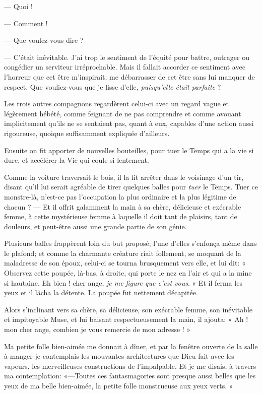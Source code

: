 --- Quoi !

--- Comment !

--- Que voulez{}-vous dire ?

--- C’était inévitable. J’ai trop le
sentiment de l’équité pour battre, outrager ou
congédier un serviteur irréprochable. Mais il fallait accorder ce
sentiment avec l’horreur que cet être
m’inspirait; me débarrasser de cet être sans lui
manquer de respect. Que vouliez{}-vous que je fisse
d’elle, \textit{puisqu’elle était parfaite} ?

Les trois autres compagnons regardèrent celui{}-ci avec un regard vague
et légèrement hébété, comme feignant de ne pas comprendre et comme
avouant implicitement qu’ils ne se sentaient pas,
quant à eux, capables d’une action aussi rigoureuse,
quoique suffisamment expliquée d’ailleurs.

Ensuite on fit apporter de nouvelles bouteilles, pour tuer le Temps qui
a la vie si dure, et accélérer la Vie qui coule si lentement.


Comme la voiture traversait le bois, il la fit arrêter dans le voisinage
d’un tir, disant qu’il lui serait
agréable de tirer quelques balles pour \textit{tuer} le Temps. Tuer ce
monstre{}-là, n’est{}-ce pas
l’occupation la plus ordinaire et la plus légitime de
chacun ? --- Et il offrit galamment la main à sa chère, délicieuse et
exécrable femme, à cette mystérieuse femme à laquelle il doit tant de
plaisirs, tant de douleurs, et peut{}-être aussi une grande partie de
son génie.

Plusieurs balles frappèrent loin du but proposé; l’une
d’elles s’enfonça même dans le
plafond; et comme la charmante créature riait follement, se moquant de
la maladresse de son époux, celui{}-ci se tourna brusquement vers elle,
et lui dit: « Observez cette poupée, là{}-bas, à droite, qui porte le
nez en l’air et qui a la mine si hautaine. Eh bien !
cher ange, \textit{je me figure que c’est vous}. » Et il ferma
les yeux et il lâcha la détente. La poupée fut nettement décapitée.

Alors s’inclinant vers sa chère, sa délicieuse, son
exécrable femme, son inévitable et impitoyable Muse, et lui baisant
respectueusement la main, il ajouta: « Ah ! mon cher ange, combien je
vous remercie de mon adresse ! »



Ma petite folle bien{}-aimée me donnait à dîner, et par la fenêtre
ouverte de la salle à manger je contemplais les mouvantes architectures
que Dieu fait avec les vapeurs, les merveilleuses constructions de
l’impalpable. Et je me disais, à travers ma
contemplation: «---Toutes ces fantasmagories sont presque aussi belles
que les yeux de ma belle bien{}-aimée, la petite folle monstrueuse aux
yeux verts. »

